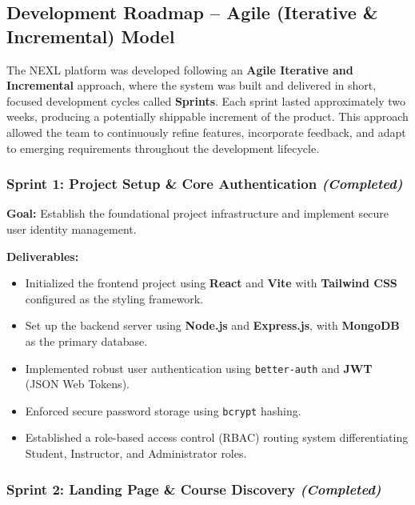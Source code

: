
\subsection{Development Roadmap -- Agile (Iterative \& Incremental) Model}

The NEXL platform was developed following an \textbf{Agile Iterative and Incremental} approach, where the system was built and delivered in short, focused development cycles called \textbf{Sprints}. Each sprint lasted approximately two weeks, producing a potentially shippable increment of the product. This approach allowed the team to continuously refine features, incorporate feedback, and adapt to emerging requirements throughout the development lifecycle.

\subsubsection*{Sprint 1: Project Setup \& Core Authentication \hfill \textit{(Completed)}}

\textbf{Goal:} Establish the foundational project infrastructure and implement secure user identity management.

\textbf{Deliverables:}
\begin{itemize}
    \item Initialized the frontend project using \textbf{React} and \textbf{Vite} with \textbf{Tailwind CSS} configured as the styling framework.
    \item Set up the backend server using \textbf{Node.js} and \textbf{Express.js}, with \textbf{MongoDB} as the primary database.
    \item Implemented robust user authentication using \texttt{better-auth} and \textbf{JWT} (JSON Web Tokens).
    \item Enforced secure password storage using \texttt{bcrypt} hashing.
    \item Established a role-based access control (RBAC) routing system differentiating Student, Instructor, and Administrator roles.
\end{itemize}

\subsubsection*{Sprint 2: Landing Page \& Course Discovery \hfill \textit{(Completed)}}

